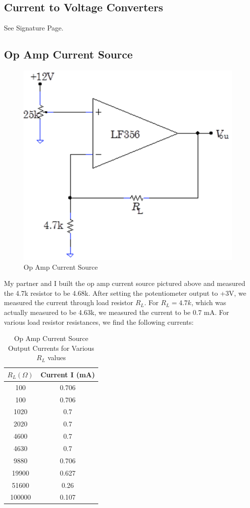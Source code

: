 \documentclass{article}
\begin{document}
\subsection{Current to Voltage Converters}
    See Signature Page.
\subsection{Op Amp Current Source}
    \begin{figure}[H]
        \centering
        \includegraphics[scale = 0.5]{12.png}
        \caption{Op Amp Current Source ~\cite{webfig}}
        \label{fig:my_label}
    \end{figure}
    My partner and I built the op amp current source pictured above and measured the 4.7k resistor to be 4.68k. After setting the potentiometer output to +3V, we measured the current through load resistor $R_L$. For $R_L = 4.7k$, which was actually measured to be 4.63k, we measured the current to be 0.7 mA. For various load resistor resistances, we find the following currents:
    \begin{table}[H]
        \centering
        \caption{Op Amp Current Source Output Currents for Various $R_L$ values}
        \label{my-label}
        \begin{tabular}{cc}
        \textbf{$R_L (\Omega)$} & \textbf{Current I (mA)} \\ \hline
        100 & 0.706 \\
        100 & 0.706 \\
        1020 & 0.7 \\
        2020 & 0.7 \\
        4600 & 0.7 \\
        4630 & 0.7 \\
        9880 & 0.706 \\
        19900 & 0.627 \\
        51600 & 0.26 \\
        100000 & 0.107
        \end{tabular}
    \end{table}
\end{document}
